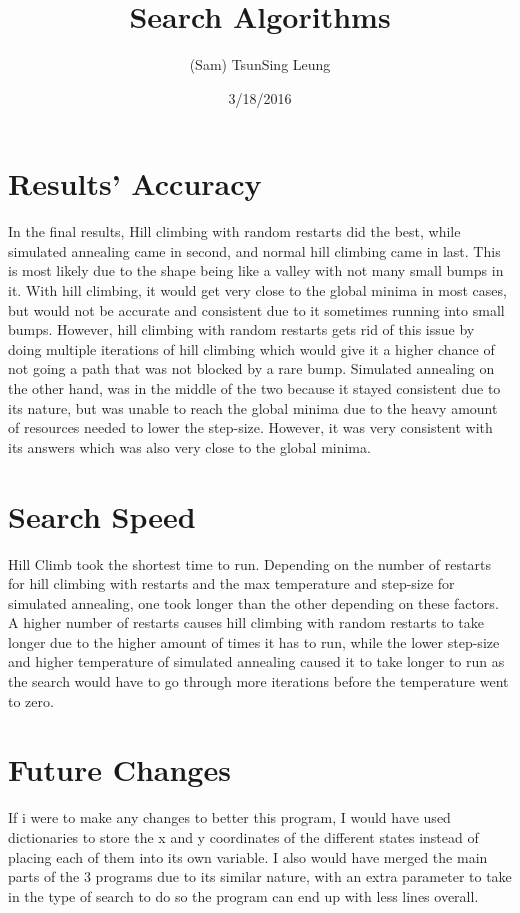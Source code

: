 \documentclass{article}
\title{Search Algorithms}
\author{(Sam) TsunSing Leung }
\date{3/18/2016}
\begin{document}

\section{\large Results' Accuracy}

    In the final results, Hill climbing with random restarts did the best, while simulated annealing came in second, and normal hill climbing came in last. This is most likely due to the shape being like a valley with not many small bumps in it. With hill climbing, it would get very close to the global minima in most cases, but would not be accurate and consistent due to it sometimes running into small bumps. However, hill climbing with random restarts gets rid of this issue by doing multiple iterations of hill climbing which would give it a higher chance of not going a path that was not blocked by a rare bump. Simulated annealing on the other hand, was in the middle of the two because it stayed consistent due to its nature, but was unable to reach the global minima due to the heavy amount of resources needed to lower the step-size. However, it was very consistent with its answers which was also very close to the global minima.

\section{\large Search Speed}

    Hill Climb took the shortest time to run. Depending on the number of restarts for hill climbing with restarts and the max temperature and step-size for simulated annealing, one took longer than the other depending on these factors. A higher number of restarts causes hill climbing with random restarts to take longer due to the higher amount of times it has to run, while the lower step-size and higher temperature of simulated annealing caused it to take longer to run as the search would have to go through more iterations before the temperature went to zero.

\section{\large Future Changes}

    If i were to make any changes to better this program, I would have used dictionaries to store the x and y coordinates of the different states instead of placing each of them into its own variable. I also would have merged the main parts of the 3 programs due to its similar nature, with an extra parameter to take in the type of search to do so the program can end up with less lines overall.
\end{document}
